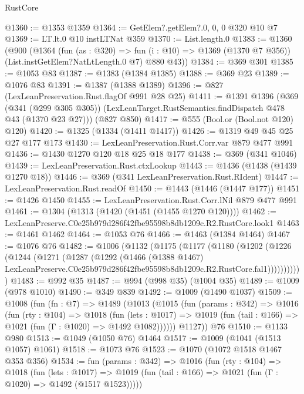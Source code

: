 \begin{lexlean}{RustCore}
\begin{coremodule}
@1360 := @1353 @1359
@1364 := GetElem?.getElem?.{0, 0, 0} @320 @10 @7
@1369 := LT.lt.{0} @10 instLTNat @359
@1370 := List.length.{0}
@1383 := @1360
    (@900
      (@1364
        (fun (as : @320) => fun (i : @10) => @1369 (@1370 @7 @356))
        (List.instGetElem?NatLtLength.{0} @7)
        @880
        @43))
@1384 := @369 @301
@1385 := @1053 @83
@1387 := @1383 (@1384 @1385)
@1388 := @369 @23
@1389 := @1076 @83
@1391 := @1387 (@1388 @1389)
@1396 := @827 (LexLeanPreservation.Rust.flagOf @991 @28 @25)
@1411 := @1391
    @1396
    (@369
      (@341 (@299 @305 @305))
      (LexLeanTarget.RustSemantics.findDispatch @478 @43 (@1370 @23 @27)))
    (@827 @850)
@1417 := @555 (Bool.or (Bool.not @120) @120)
@1420 := @1325 (@1334 (@1411 @1417))
@1426 := @1319 @49 @45 @25 @27 @177 @173
@1430 := LexLeanPreservation.Rust.Corr.var @879 @477 @991
@1436 := @1430 @1270 @120 @18 @25 @18 @177
@1438 := @369 (@341 @1046)
@1439 := LexLeanPreservation.Rust.ctxLookup
@1443 := @1436 (@1438 (@1439 @1270 @18))
@1446 := @369 (@341 LexLeanPreservation.Rust.RIdent)
@1447 := LexLeanPreservation.Rust.readOf
@1450 := @1443 (@1446 (@1447 @177))
@1451 := @1426 @1450
@1455 := LexLeanPreservation.Rust.Corr.lNil @879 @477 @991
@1461 := @1304 (@1313 (@1420 (@1451 (@1455 @1270 @120))))
@1462 := LexLeanPreserve.C0e25b979d286f42fbe95598b8db1209c.R2.RustCore.look1
@1463 := @1461 @1462
@1464 := @1053 @76
@1466 := @1463 (@1384 @1464)
@1467 := @1076 @76
@1482 := @1006
    (@1132
      (@1175
        (@1177
          (@1180
            (@1202
              (@1226
                (@1244
                  (@1271
                    (@1287
                      (@1292
                        (@1466
                          (@1388 @1467)
                          LexLeanPreserve.C0e25b979d286f42fbe95598b8db1209c.R2.RustCore.fal1)))))))))))
@1483 := @992 @35
@1487 := @994 (@998 @35) (@1004 @35)
@1489 := @1009 (@978 @1010)
@1490 := @349 @839
@1492 := @1009 (@1490 @1037)
@1509 := @1008
    (fun (fn : @7) =>
    @1489
      (@1013
        (@1015
          (fun (params : @342) =>
          @1016
            (fun (rty : @104) =>
            @1018
              (fun (lets : @1017) =>
              @1019 (fun (tail : @166) => @1021 (fun (Γ : @1020) => @1492 @1082))))))
        @1127))
    @76
@1510 := @1133 @980
@1513 := @1049 (@1050 @76) @1464
@1517 := @1009 (@1041 (@1513 @1057) @1061)
@1518 := @1073 @76
@1523 := @1070 (@1072 @1518 @1467 @353 @356)
@1534 := fun (params : @342) =>
  @1016
    (fun (rty : @104) =>
    @1018
      (fun (lets : @1017) =>
      @1019 (fun (tail : @166) => @1021 (fun (Γ : @1020) => @1492 (@1517 @1523)))))

\end{coremodule}
\end{lexlean}
